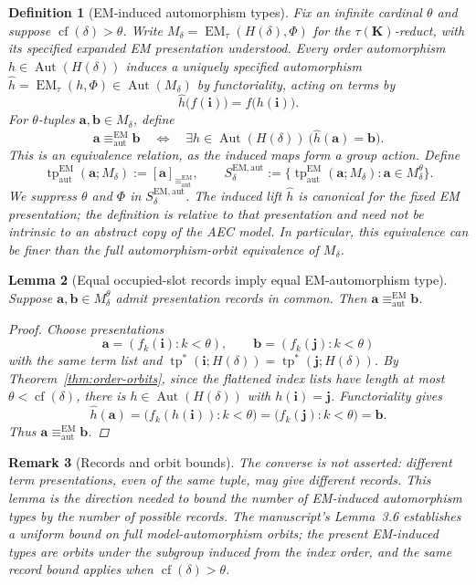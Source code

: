 \documentclass[11pt]{article}
\newcommand{\K}{\mathbf K}
\newcommand{\EMauttp}{\operatorname{tp}^{\mathrm{EM}}_{\mathrm{aut}}}
\newcommand{\tpstar}{\operatorname{tp}^{*}}
\newcommand{\EM}{\operatorname{EM}_{\tau}}
\newcommand{\ba}{\mathbf{a}}
\newcommand{\bb}{\mathbf{b}}
\newcommand{\bi}{\mathbf{i}}
\newcommand{\bj}{\mathbf{j}}
\theoremstyle{plain}
\newtheorem{definition}{Definition}[section]
\newtheorem{lemma}[definition]{Lemma}
\newtheorem{remark}[definition]{Remark}
\begin{document}
\begin{definition}[EM-induced automorphism types]
Fix an infinite cardinal $\theta$ and suppose $\operatorname{cf}(\delta)>\theta$.
Write $M_\delta=\EM(H(\delta),\Phi)$ for the $\tau(\K)$-reduct,
with its specified expanded EM presentation understood.
Every order automorphism $h\in\operatorname{Aut}(H(\delta))$
induces a uniquely specified automorphism
$\widehat h=\EM(h,\Phi)\in\operatorname{Aut}(M_\delta)$
by functoriality, acting on terms by
\[
\widehat h\bigl(f(\bi)\bigr)=f\bigl(h(\bi)\bigr).
\]
For $\theta$-tuples $\ba,\bb\in M_\delta$, define
\[
\ba\equiv^{\mathrm{EM}}_{\mathrm{aut}}\bb
\quad\Longleftrightarrow\quad
\exists h\in\operatorname{Aut}(H(\delta))\
\bigl(\widehat h(\ba)=\bb\bigr).
\]
This is an equivalence relation, as the induced maps form a group
action. Define
\[
\EMauttp(\ba;M_\delta):=[\ba]_{\equiv^{\mathrm{EM}}_{\mathrm{aut}}},
\qquad
S^{\mathrm{EM,aut}}_\delta:=
\bigl\{\EMauttp(\ba;M_\delta):\ba\in M_\delta^\theta\bigr\}.
\]
We suppress $\theta$ and $\Phi$ in $S^{\mathrm{EM,aut}}_\delta$.
The induced lift $\widehat h$ is canonical for the fixed EM
presentation; the definition is \emph{relative to that presentation}
and need not be intrinsic to an abstract copy of the AEC model.
In particular, this equivalence can be finer than the full
automorphism-orbit equivalence of $M_\delta$.
\end{definition}

\begin{lemma}[Equal occupied-slot records imply equal EM-automorphism type]
Suppose $\ba,\bb\in M_\delta^\theta$ admit presentation records in common.
Then $\ba\equiv^{\mathrm{EM}}_{\mathrm{aut}}\bb$.

\begin{proof}
Choose presentations
\[
\ba=(f_k(\bi):k<\theta),\qquad
\bb=(f_k(\bj):k<\theta)
\]
with the same term list and
$\tpstar(\bi;H(\delta))
 =\tpstar(\bj;H(\delta))$.
By Theorem~\ref{thm:order-orbits}, since the flattened index lists have length at
most $\theta<\operatorname{cf}(\delta)$, there is
$h\in\operatorname{Aut}(H(\delta))$ with $h(\bi)=\bj$.
Functoriality gives
\[
\widehat h(\ba)
 =\bigl(f_k(h(\bi)):k<\theta\bigr)
 =\bigl(f_k(\bj):k<\theta\bigr)=\bb.
\]
Thus $\ba\equiv^{\mathrm{EM}}_{\mathrm{aut}}\bb$.
\end{proof}
\end{lemma}

\begin{remark}[Records and orbit bounds]
The converse is not asserted: different term presentations, even of
the same tuple, may give different records. This lemma is the
direction needed to bound the number of EM-induced automorphism types by the number
of possible records. The manuscript's Lemma~3.6 establishes a
uniform bound on \emph{full model-automorphism orbits}; the present
EM-induced types are orbits under the subgroup induced from the index
order, and the same record bound applies when
$\operatorname{cf}(\delta)>\theta$.
\end{remark}
\end{document}
